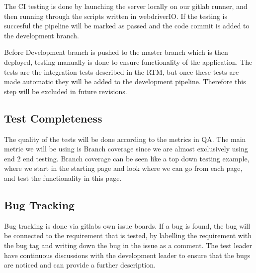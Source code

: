 The CI testing is done by launching the server locally on our gitlab runner, and then running through the scripts written in webdriverIO. If the testing is succesful the pipeline will be marked as passed and the code commit is added to the development branch.

Before Development branch is pushed to the master branch which is then deployed, testing manually is done to ensure functionality of the application. The tests are the integration tests described in the RTM, but once these tests are made automatic they will be added to the development pipeline. Therefore this step will be excluded in future revisions. 

\subsection{Test Completeness}
The quality of the tests will be done according to the metrics in QA. The main metric we will be using is Branch coverage since we are almost exclusively using end 2 end testing. Branch coverage can be seen like a top down testing example, where we start in the starting page and look where we can go from each page, and test the functionality in this page. 

\subsection{Bug Tracking}
Bug tracking is done via gitlabs own issue boards. If a bug is found, the bug will be connected to the requirement that is tested, by labelling the requirement with the bug tag and writing down the bug in the issue as a comment. The test leader have continuous discussions with the development leader to ensure that the bugs are noticed and can provide a further description.

\clearpage